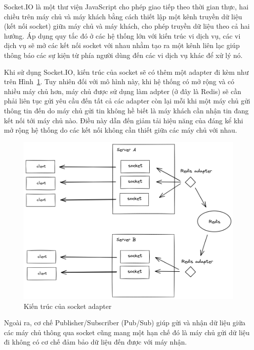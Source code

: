 Socket.IO là một thư viện JavaScript cho phép giao tiếp theo thời gian thực, hai chiều trên máy chủ và máy khách bằng cách thiết lập một kênh truyền dữ liệu (kết nối socket) giữa máy chủ và máy khách, cho phép truyền dữ liệu theo cả hai hướng.
Áp dụng quy tắc đó ở các hệ thống lớn với kiến trúc vi dịch vụ, các vi dịch vụ sẽ mở các kết nối socket với nhau nhằm tạo ra một kênh liên lạc giúp thông báo các sự kiện từ phía người dùng đến các vi dịch vụ khác để xử lý nó.

Khi sử dụng Socket.IO, kiến trúc của socket sẽ có thêm một adapter đi kèm như trên Hình~\ref{fig:socket-adapter}.
Tuy nhiên đối với mô hình này, khi hệ thống có mở rộng và có nhiều máy chủ hơn, máy chủ được sử dụng làm adpter (ở đây là Redis) sẽ cần phải liên tục gửi yêu cầu đến tất cả các adapter còn lại mỗi khi một máy chủ gửi thông tin đến do máy chủ gửi tin không hề biết là máy khách cần nhận tin đang kết nối tới máy chủ nào.
Điều này dẫn đến giảm tải hiệu năng của đáng kể khi mở rộng hệ thống do các kết nối không cần thiết giữa các máy chủ với nhau.

\begin{figure}[ht]
	\centering
	\includegraphics[width=\textwidth]{images/hChip/RabbitMQ/socket-adapter.png}
	\caption{Kiến trúc của socket adapter ~\protect\footnotemark}
	\label{fig:socket-adapter}
\end{figure}

Ngoài ra, cơ chế Publisher/Subscriber (Pub/Sub) giúp gửi và nhận dữ liệu giữa các máy chủ thông qua socket cũng mang một hạn chế đó là máy chủ gửi dữ liệu đi không có cơ chế đảm bảo dữ liệu đến được với máy nhận.


